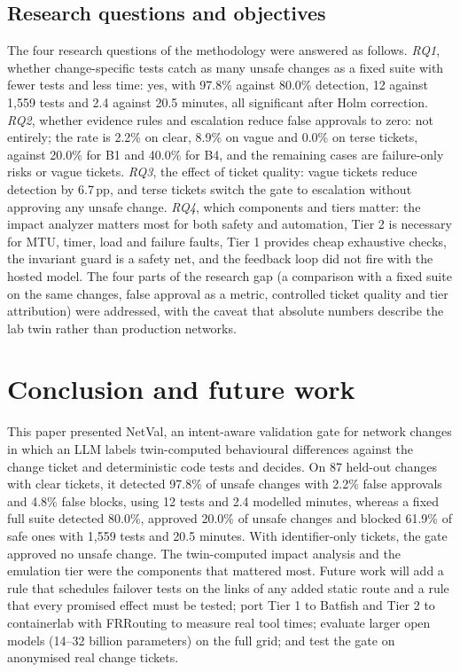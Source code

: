 \documentclass[pdflatex,iicol,sn-mathphys-num]{sn-jnl}%
\newcommand{\pp}{\,pp}
\theoremstyle{thmstyletwo}%
\begin{document}
\subsection{Research questions and objectives}\label{sec:rq}

The four research questions of the methodology were answered as follows. \emph{RQ1}, whether change-specific tests catch as many unsafe changes as a fixed suite with fewer tests and less time: yes, with 97.8\% against 80.0\% detection, 12 against 1{,}559 tests and 2.4 against 20.5 minutes, all significant after Holm correction. \emph{RQ2}, whether evidence rules and escalation reduce false approvals to zero: not entirely; the rate is 2.2\% on clear, 8.9\% on vague and 0.0\% on terse tickets, against 20.0\% for B1 and 40.0\% for B4, and the remaining cases are failure-only risks or vague tickets. \emph{RQ3}, the effect of ticket quality: vague tickets reduce detection by 6.7\pp, and terse tickets switch the gate to escalation without approving any unsafe change. \emph{RQ4}, which components and tiers matter: the impact analyzer matters most for both safety and automation, Tier 2 is necessary for MTU, timer, load and failure faults, Tier 1 provides cheap exhaustive checks, the invariant guard is a safety net, and the feedback loop did not fire with the hosted model. The four parts of the research gap (a comparison with a fixed suite on the same changes, false approval as a metric, controlled ticket quality and tier attribution) were addressed, with the caveat that absolute numbers describe the lab twin rather than production networks.

\section{Conclusion and future work}\label{sec:conclusion}

This paper presented NetVal, an intent-aware validation gate for network changes in which an LLM labels twin-computed behavioural differences against the change ticket and deterministic code tests and decides. On 87 held-out changes with clear tickets, it detected 97.8\% of unsafe changes with 2.2\% false approvals and 4.8\% false blocks, using 12 tests and 2.4 modelled minutes, whereas a fixed full suite detected 80.0\%, approved 20.0\% of unsafe changes and blocked 61.9\% of safe ones with 1{,}559 tests and 20.5 minutes. With identifier-only tickets, the gate approved no unsafe change. The twin-computed impact analysis and the emulation tier were the components that mattered most. Future work will add a rule that schedules failover tests on the links of any added static route and a rule that every promised effect must be tested; port Tier 1 to Batfish and Tier 2 to containerlab with FRRouting to measure real tool times; evaluate larger open models (14--32 billion parameters) on the full grid; and test the gate on anonymised real change tickets.
\end{document}
